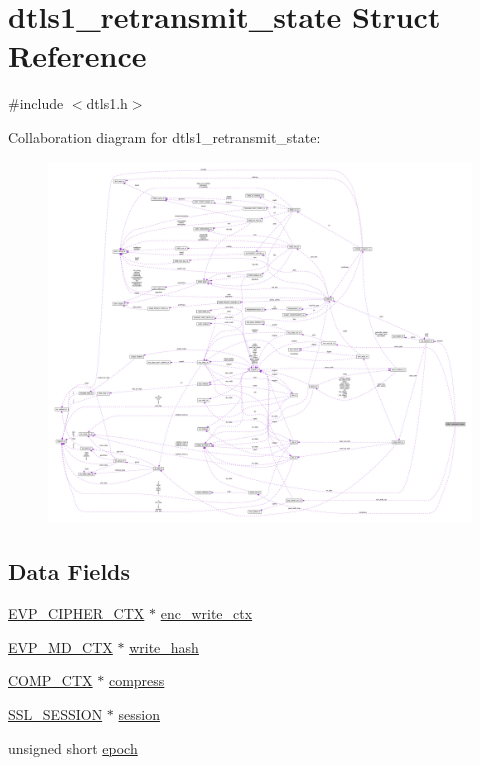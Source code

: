 \hypertarget{structdtls1__retransmit__state}{}\section{dtls1\+\_\+retransmit\+\_\+state Struct Reference}
\label{structdtls1__retransmit__state}


{\ttfamily \#include $<$dtls1.\+h$>$}



Collaboration diagram for dtls1\+\_\+retransmit\+\_\+state\+:\nopagebreak
\begin{figure}[H]
\begin{center}
\leavevmode
\includegraphics[width=350pt]{structdtls1__retransmit__state__coll__graph}
\end{center}
\end{figure}
\subsection*{Data Fields}
\begin{DoxyCompactItemize}
\item 
\hyperlink{crypto_2ossl__typ_8h_aab2bd6a044e1d31ebc2fe82b3b0b3d9a}{E\+V\+P\+\_\+\+C\+I\+P\+H\+E\+R\+\_\+\+C\+TX} $\ast$ \hyperlink{structdtls1__retransmit__state_a008aa0802f957af09044855de3328198}{enc\+\_\+write\+\_\+ctx}
\item 
\hyperlink{crypto_2ossl__typ_8h_a69cda4d21bd068f01c469222c1dd92fe}{E\+V\+P\+\_\+\+M\+D\+\_\+\+C\+TX} $\ast$ \hyperlink{structdtls1__retransmit__state_a037b7f73660f920b2fb9753b71fb17b7}{write\+\_\+hash}
\item 
\hyperlink{crypto_2comp_2comp_8h_a9aa3298bb113c7c8e26a4f5cb9efb6d5}{C\+O\+M\+P\+\_\+\+C\+TX} $\ast$ \hyperlink{structdtls1__retransmit__state_a72a47e1480cd1636742b4562411bdec2}{compress}
\item 
\hyperlink{include_2openssl_2ssl_8h_a8dd6b81bbcb1b2d769235c37779d2a94}{S\+S\+L\+\_\+\+S\+E\+S\+S\+I\+ON} $\ast$ \hyperlink{structdtls1__retransmit__state_a256a14c1af5a5311e78f1037d7ee2274}{session}
\item 
unsigned short \hyperlink{structdtls1__retransmit__state_a4675237d0516bb5e6482bcc153326f91}{epoch}
\end{DoxyCompactItemize}


